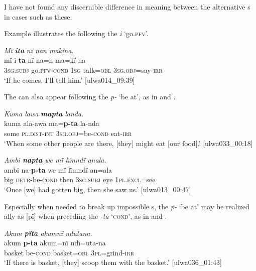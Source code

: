 I have not found any discernible difference in meaning between the alternative s in cases such as these.

Example  illustrates the   following the    \textit{i} ‘go.\textsc{pfv}’.

\ea%
    \label{ex:verbs:91}
          \textit{Mï} \textbf{\textit{ita}} \textit{nï nan makïna.}\\
\gll    mï       i-\textbf{ta}       nï     na=n     ma=kï-na\\
    3\textsc{sg.subj}  go.\textsc{pfv-cond}  1\textsc{sg}  talk=\textsc{obl}  3\textsc{sg.obj}=say-\textsc{irr}\\
\glt `If he comes, I’ll tell him.’ [ulwa014\_09:39]
\z

The   can also appear following the  \textit{p-} ‘be at’, as in  and .

\ea%
    \label{ex:verbs:92}
          \textit{Kuma lawa} \textbf{\textit{mapta}} \textit{landa.}\\
\gll    kuma  ala{}-awa    ma=\textbf{p-ta}       la-nda\\
    some  \textsc{pl.dist-int}  3\textsc{sg.obj}=be-\textsc{cond}  eat-\textsc{irr}\\
\glt `When some other people are there, [they] might eat [our food].’ [ulwa033\_00:18]
\z

\ea%
    \label{ex:verbs:93}
          \textit{Ambi \textbf{napta} we mï lïmndï anala.}\\
\gll    ambi  na-\textbf{p-ta}      we    mï       lïmndï  an=ala\\
    big    \textsc{detr-}be\textsc{{}-cond}  then  3\textsc{sg.subj}  eye    \textsc{1pl.excl}=see\\
\glt `Once [we] had gotten big, then she saw us.’ [ulwa013\_00:47]
\z

Especially when needed to break up impossible s, the  \textit{p-} ‘be at’ may be realized ally as [pï] when preceding the   \textit{-ta} ‘\textsc{cond}’, as in  and .

\ea%
    \label{ex:verbs:94}
          \textit{Akum \textbf{pïta} akumnï ndutana.}\\
\gll    akum    \textbf{p-ta}     akum=nï    ndï=uta-na\\
    basket  be\textsc{{}-cond} basket=\textsc{obl}  \textsc{3pl}=grind-\textsc{irr}\\
\glt `If there is basket, [they] scoop them with the basket.’ [ulwa036\_01:43]
\z

